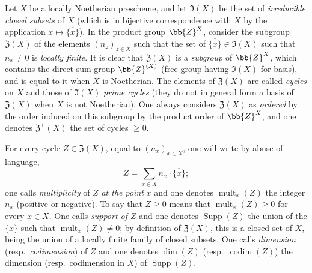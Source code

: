 
\begin{env}[21.6.1]
\label{IV.21.6.1}
Let $X$ be a locally Noetherian prescheme, and let $\mathfrak{I}(X)$ be the set of \emph{irreducible closed subsets} of $X$ (which is in bijective correspondence with $X$ by the application $x\mapsto\overline{\{x\}}$).
In the product group $\bb{Z}^X$, consider the subgroup $\mathfrak{Z}(X)$ of the elements $(n_z)_{z\in X}$ such that the set of $\overline{\{x\}}\in\mathfrak{I}(X)$ such that $n_x\neq 0$ is \emph{locally finite}.
It is clear that $\mathfrak{Z}(X)$ is a \emph{subgroup} of $\bb{Z}^X$, which contains the direct sum group $\bb{Z}^{(X)}$ (free group having $\mathfrak{I}(X)$ for basis), and is equal to it when $X$ is Noetherian.
The elements of $\mathfrak{Z}(X)$ are called \emph{cycles} on $X$ and those of $\mathfrak{I}(X)$ \emph{prime cycles} (they do not in general form a basis of $\mathfrak{Z}(X)$ when $X$ is not Noetherian).
One always considers $\mathfrak{Z}(X)$ as \emph{ordered} by the order induced on this subgroup by the product order of $\bb{Z}^X$, and one denotes $\mathfrak{Z}^+(X)$ the set of cycles $\geq 0$.

For every cycle $Z\in\mathfrak{Z}(X)$, equal to $(n_x)_{x\in X}$, one will write by abuse of language,
\[
  Z=\sum_{x\in X}n_x\cdot\overline{\{x\}};
\]
one calls \emph{multiplicity} of $Z$ \emph{at the point} $x$ and one denotes $\operatorname{mult}_x(Z)$ the integer $n_x$ (positive or negative).
To say that $Z\geq 0$ means that $\operatorname{mult}_x(Z)\geq 0$ for every $x\in X$.
One calls \emph{support of $Z$} and one denotes $\operatorname{Supp}(Z)$ the union of the $\overline{\{x\}}$ such that $\operatorname{mult}_x(Z)\neq 0$;
by definition of $\mathfrak{Z}(X)$, this is a closed set of $X$, being the union of a locally finite family of closed subsets.
One calls \emph{dimension} (resp.\ \emph{codimension}) of $Z$ and one denotes $\dim(Z)$ (resp.\ $\operatorname{codim}(Z)$) the dimension (resp.\ codimension in $X$) of $\operatorname{Supp}(Z)$.
\end{env}

